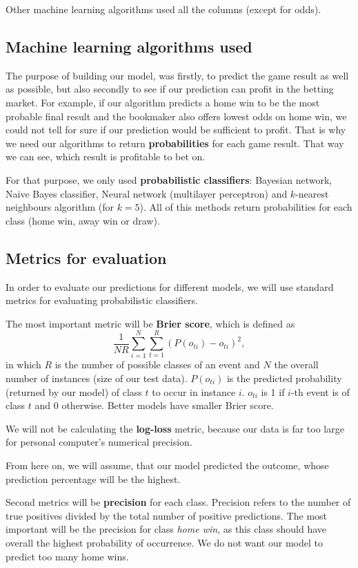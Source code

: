 \documentclass[conference]{IEEEtran}
\begin{document}
Other machine learning algorithms used all the columns (except for odds).

\subsection{Machine learning algorithms used}

The purpose of building our model, was firstly, to predict the game result as well as possible,
but also secondly to see if our prediction can profit in the betting market. For example,
if our algorithm predicts a home win to be the most probable final result and the bookmaker
also offers lowest odds on home win, we could not tell for sure if our prediction would be
sufficient to profit. That is why we need our algorithms to return \textbf{probabilities} for
each game result. That way we can see, which result is profitable to bet on.

For that purpose, we only used \textbf{probabilistic classifiers}: Bayesian network, Naive
Bayes classifier, Neural network (multilayer perceptron) and $k$-nearest neighbours algorithm 
(for $k=5$). All of this methods return probabilities for each class (home win, away win or draw).

\subsection{Metrics for evaluation}

In order to evaluate our predictions for different models, we will use standard metrics for 
evaluating probabilistic classifiers. 

The most important metric will be \textbf{Brier score}, which is defined as 
$$\frac{1}{N R} \sum_{i=1}^{N} \sum_{t=1}^{R} {(P(o_{ti}) - o_{ti})^2},$$ in which $R$ is the
number of possible classes of an event and $N$ the overall number of instances (size of our
test data). $P(o_{ti})$ is the predicted probability (returned by our model) of class $t$ 
to occur in instance $i$. $o_{ti}$ is 1 if $i$-th event is of class $t$ and 0 otherwise. 
Better models have smaller 
Brier score.

We will not be calculating the \textbf{log-loss} metric, because our data is far too large 
for personal computer's numerical precision.

From here on, we will assume, that our model predicted the outcome, whose prediction 
percentage will be the highest. 

Second metrics will be \textbf{precision} for each class. Precision refers to the number of 
true positives divided by the total number of positive predictions. The most important will 
be the precision for class \textit{home win}, as this class should have overall the highest 
probability of occurrence. We do not want our model to predict too many home wins.
\end{document}
